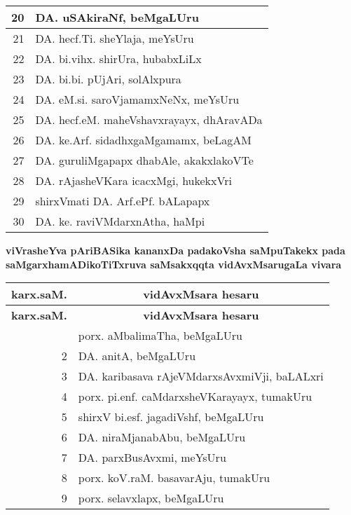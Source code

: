 {\begin{longtable}{|r|p{10cm}|}
\hline
20 & DA. uSAkiraNf, beMgaLUru\\
\hline
21 & DA. hecf.Ti. sheYlaja, meYsUru\\
\hline
22 & DA. bi.vihx. shirUra, hubabxLiLx\\
\hline
23 & DA. bi.bi. pUjAri, solAlxpura\\
\hline
24 & DA. eM.si. saroVjamamxNeNx, meYsUru\\
\hline
25 & DA. hecf.eM. maheVshavxrayayx, dhAravADa\\
\hline
26 & DA. ke.Arf. sidadhxgaMgamamx, beLagAM\\
\hline
27 & DA. guruliMgapapx dhabAle, akakxlakoVTe\\
\hline
28 & DA. rAjasheVKara icacxMgi, hukekxVri\\
\hline
29 & shirxVmati DA. Arf.ePf. bALapapx\\
\hline
30 & DA. ke. raviVMdarxnAtha, haMpi\\
\hline
\end{longtable}}

\vskip 1cm


\begin{center}
{\large\bf viVrasheYva pAriBASika kananxDa padakoVsha saMpuTakekx pada saMgarxha\break mADikoTiTxruva saMsakxqqta vidAvxMsarugaLa vivara}
\end{center}

{\renewcommand{\arraystretch}{1.3}
\begin{longtable}{|r|p{10cm}|}
\hline
{\bf karx.saM.} & \multicolumn{1}{c|}{\bf vidAvxMsara hesaru}\\
\hline
\endfirsthead
\hline
{\bf karx.saM.} & \multicolumn{1}{c|}{\bf vidAvxMsara hesaru}\\
\hline
\endhead
\hline
\endfoot
\endlastfoot
1 & porx. aMbalimaTha, beMgaLUru\\
\hline
2 & DA. anitA, beMgaLUru\\
\hline
3 & DA. karibasava rAjeVMdarxsAvxmiVji, baLALxri\\
\hline
4 & porx. pi.enf. caMdarxsheVKarayayx, tumakUru\\
\hline
5 & shirxV bi.esf. jagadiVshf, beMgaLUru\\
\hline
6 & DA. niraMjanabAbu, beMgaLUru\\
\hline
7 & DA. parxBusAvxmi, meYsUru\\
\hline
8 & porx. koV.raM. basavarAju, tumakUru\\
\hline
9 & porx. selavxlapx, beMgaLUru\\
\hline
\end{longtable}}

